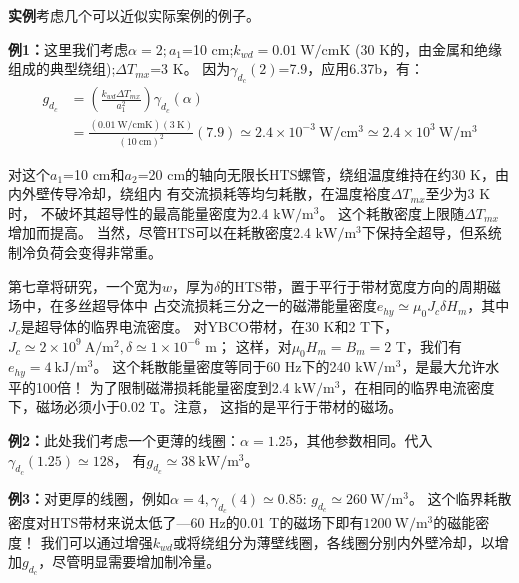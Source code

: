 \textbf{实例}\quad 考虑几个可以近似实际案例的例子。

\textbf{例1：}\quad 这里我们考虑$\alpha=2;a_1$=10 cm;$k_{wd}=0.01\ \mathrm{W/cm K}$
(30 K的，由金属和绝缘组成的典型绕组);$\Delta T_{mx}$=3 K。
因为$\gamma_{d_c}(2)$=7.9，应用6.37b，有：
\begin{align*}%
g_{d_c}&=(\frac{k_{wd}\Delta T_{mx}}{a_1^2})\gamma_{d_c}(\alpha)\\\tag{6.37b}
&=\frac{(0.01\ \mathrm{W/cmK})(3\ \mathrm{K})}{(10\ \mathrm{cm})^2}(7.9)\simeq 2.4\times 10^{-3}\ \mathrm{W/cm^3}\simeq 2.4\times 10^3\ \mathrm{W/m^3}
\end{align*}

对这个$a_1$=10 cm和$a_2$=20 cm的轴向无限长HTS螺管，绕组温度维持在约30 K，由内外壁传导冷却，绕组内
有交流损耗等均匀耗散，在温度裕度$\Delta T_{mx}$至少为3 K时，
不破坏其超导性的最高能量密度为2.4 $\mathrm{kW/m^3}$。
这个耗散密度上限随$\Delta T_{mx}$增加而提高。
当然，尽管HTS可以在耗散密度2.4 $\mathrm{kW/m^3}$下保持全超导，但系统制冷负荷会变得非常重。

第七章将研究，一个宽为$w$，厚为$\delta$的HTS带，置于平行于带材宽度方向的周期磁场中，在多丝超导体中
占交流损耗三分之一的磁滞能量密度$e_{hy}\simeq\mu_0 J_c \delta H_m$，其中$J_c$是超导体的临界电流密度。
对YBCO带材，在30 K和2 T下，$J_c\simeq 2\times 10^9\ \mathrm{A/m^2},\delta\simeq 1\times 10^{-6}$ m；
这样，对$\mu_0 H_m=B_m=2$ T，我们有$e_{hy}=4\ \mathrm{kJ/m^3}$。
这个耗散能量密度等同于60 Hz下的240 $\mathrm{kW/m^3}$，是最大允许水平的100倍！
为了限制磁滞损耗能量密度到2.4 $\mathrm{kW/m^3}$，在相同的临界电流密度下，磁场必须小于0.02 T。注意，
这指的是平行于带材的磁场。


\textbf{例2：}\quad 此处我们考虑一个更薄的线圈：$\alpha=1.25$，其他参数相同。代入$\gamma_{d_c}(1.25)\simeq 128$，
有$g_{d_c}\simeq 38\ \mathrm{kW/m^3}$。

\textbf{例3：}\quad 对更厚的线圈，例如$\alpha=4,\gamma_{d_c}(4)\simeq 0.85$:
$g_{d_c}\simeq 260\ \mathrm{W/m^3}$。
这个临界耗散密度对HTS带材来说太低了---60 Hz的0.01 T的磁场下即有$1200\ \mathrm{W/m^3}$的磁能密度！
我们可以通过增强$k_{wd}$或将绕组分为薄壁线圈，各线圈分别内外壁冷却，以增加$g_{d_c}$，尽管明显需要增加制冷量。

